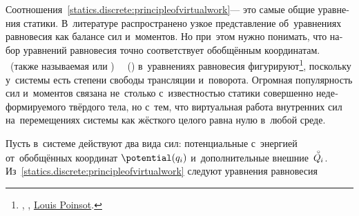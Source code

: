 \begin{otherlanguage}{russian}
Соотношения~\eqref{statics.discrete:principleofvirtualwork}\:--- это самые общие уравнения статики.
В~литературе распространено узкое представление об~уравнениях равновесия как балансе сил и~моментов.
Но при~этом нужно понимать, что набор уравнений равновесия точно соответствует обобщённым координатам.
~(также называемая  или )
~~()
в~уравнениях равновесия фигурируют\footnote{ \textcolor{magenta}{} , ,    
\href{https://gallica.bnf.fr/ark:/12148/bpt6k6213152z.texteImage}{}
\href{https://en.wikipedia.org/wiki/Louis_Poinsot}{Louis Poinsot}.}\hbox{\hspace{-0.5ex},}
поскольку у~системы есть степени свободы трансляции и~поворота.
Огромная популярность сил и~моментов связана не~столько с~известностью статики совершенно недеформируемого твёрдого тела, но с~тем, что виртуальная работа внутренних сил на~перемещениях системы как жёсткого целого равна нулю в~любой среде.

Пусть в~системе действуют два вида сил: потенциальные с~энергией от~обобщённых координат ${\potential(q_i)}$ и~дополнительные внешние~${\mathcircabove{Q}_{\hspace{-0.1ex}i}}$.
Из~\eqref{statics.discrete:principleofvirtualwork} следуют уравнения равновесия


\end{otherlanguage}
